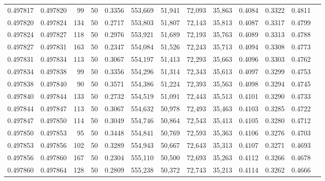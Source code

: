 \begin{tabular}{rrrrrrrrrrrrr}
0.497817 & 0.497820 &    99 &  50 &                                     0.3356 & 553,669 &  51,941 &  72,093 &  35,863 & 0.4084 & 0.3322 & 0.4811 \\
0.497820 & 0.497824 &   134 &  50 &                                     0.2717 & 553,803 &  51,807 &  72,143 &  35,813 & 0.4087 & 0.3317 & 0.4799 \\
0.497824 & 0.497827 &   118 &  50 &                                     0.2976 & 553,921 &  51,689 &  72,193 &  35,763 & 0.4089 & 0.3313 & 0.4788 \\
0.497827 & 0.497831 &   163 &  50 &                                     0.2347 & 554,084 &  51,526 &  72,243 &  35,713 & 0.4094 & 0.3308 & 0.4773 \\
0.497831 & 0.497834 &   113 &  50 &                                     0.3067 & 554,197 &  51,413 &  72,293 &  35,663 & 0.4096 & 0.3303 & 0.4762 \\
0.497834 & 0.497838 &    99 &  50 &                                     0.3356 & 554,296 &  51,314 &  72,343 &  35,613 & 0.4097 & 0.3299 & 0.4753 \\
0.497838 & 0.497840 &    90 &  50 &                                     0.3571 & 554,386 &  51,224 &  72,393 &  35,563 & 0.4098 & 0.3294 & 0.4745 \\
0.497840 & 0.497844 &   133 &  50 &                                     0.2732 & 554,519 &  51,091 &  72,443 &  35,513 & 0.4101 & 0.3290 & 0.4733 \\
0.497844 & 0.497847 &   113 &  50 &                                     0.3067 & 554,632 &  50,978 &  72,493 &  35,463 & 0.4103 & 0.3285 & 0.4722 \\
0.497847 & 0.497850 &   114 &  50 &                                     0.3049 & 554,746 &  50,864 &  72,543 &  35,413 & 0.4105 & 0.3280 & 0.4712 \\
0.497850 & 0.497853 &    95 &  50 &                                     0.3448 & 554,841 &  50,769 &  72,593 &  35,363 & 0.4106 & 0.3276 & 0.4703 \\
0.497853 & 0.497856 &   102 &  50 &                                     0.3289 & 554,943 &  50,667 &  72,643 &  35,313 & 0.4107 & 0.3271 & 0.4693 \\
0.497856 & 0.497860 &   167 &  50 &                                     0.2304 & 555,110 &  50,500 &  72,693 &  35,263 & 0.4112 & 0.3266 & 0.4678 \\
0.497860 & 0.497864 &   128 &  50 &                                     0.2809 & 555,238 &  50,372 &  72,743 &  35,213 & 0.4114 & 0.3262 & 0.4666 \\

\end{tabular}
